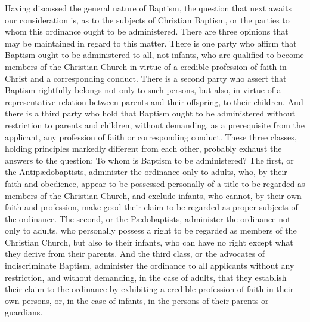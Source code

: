 \documentclass[]{book}
\begin{document}
Having discussed the general nature of Baptism, the question that next awaits our consideration is, as to the subjects of Christian Baptism, or the parties to whom this ordinance ought to be administered. There are three opinions that may be maintained in regard to this matter. There is one party who affirm that Baptism ought to be administered to all, not infants, who are qualified to become members of the Christian Church in virtue of a credible profession of faith in Christ and a corresponding conduct. There is a second party who assert that Baptism rightfully belongs not only to such persons, but also, in virtue of a representative relation between parents and their offspring, to their children. And there is a third party who hold that Baptism ought to be administered without restriction to parents and children, without demanding, as a prerequisite from the applicant, any profession of faith or corresponding conduct. These three classes, holding principles markedly different from each other, probably exhaust the answers to the question: To whom is Baptism to be administered? The first, or the Antipædobaptists, administer the ordinance only to adults, who, by their faith and obedience, appear to be possessed personally of a title to be regarded as members of the Christian Church, and exclude infants, who cannot, by their own faith and profession, make good their claim to be regarded as proper subjects of the ordinance. The second, or the Pædobaptists, administer the ordinance not only to adults, who personally possess a right to be regarded as members of the Christian Church, but also to their infants, who can have no right except what they derive from their parents. And the third class, or the advocates of indiscriminate Baptism, administer the ordinance to all applicants without any restriction, and without demanding, in the case of adults, that they establish their claim to the ordinance by exhibiting a credible profession of faith in their own persons, or, in the case of infants, in the persons of their parents or guardians.
\end{document}
